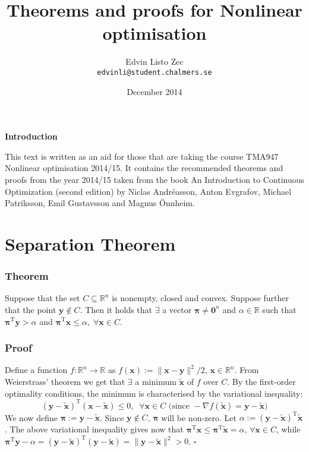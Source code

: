 \documentclass[12pt, a4paper]{article}
\title{Theorems and proofs for Nonlinear optimisation}
\author{Edvin Listo Zec \\ \texttt{edvinli@student.chalmers.se}}
\date{December 2014}
\begin{document}
\maketitle
{}
\thispagestyle{empty}
\centerline{\textbf{Introduction}}
\noindent This text is written as an aid for those that are taking the course TMA947 Nonlinear optimisation 2014/15. It contains the recommended theorems and proofs from the year 2014/15 taken from the book An Introduction to Continuous Optimization (second edition) by Niclas Andréasson, Anton Evgrafov, Michael Patriksson, Emil Gustavsson and Magnus Önnheim.
\newline
 \newline
 
\newpage
\tableofcontents
\thispagestyle{empty}
\newpage
\setcounter{page}{1}


\section{Separation Theorem}
\subsubsection*{Theorem}
Suppose that the set $C\subseteq \mathbb{R}^n$ is nonempty, closed and convex. Suppose further that the point $\bm{y}\not\in C$. Then it holds that $\exists$ a vector $\boldsymbol{\pi} \neq \bm{0}^n$ and $\alpha \in \mathbb{R}$ such that $\boldsymbol{\pi}^\text{T}\bm{y}>\alpha$ and $\boldsymbol{\pi}^\text{T}\bm{x}\leq\alpha,\; \forall \bm{x}\in C$.
\subsubsection*{Proof}
Define a function $f : \mathbb{R}^n \rightarrow \mathbb{R}$ as $f(\bm{x}) := \|\bm{x-y}\|^2/2$, $\bm{x}\in\mathbb{R}^n$. From Weierstrass' theorem we get that $\exists$ a minimum $\bm{\tilde{x}}$ of $f$ over $C$. By the first-order optimality conditions, the minimum is characterised by the variational inequality:
\begin{equation*}
(\bm{y-\tilde{x}})^\text{T}(\bm{x-\tilde{x}})\leq 0,\;\; \forall \bm{x}\in C \text{ (since } -\nabla f(\bm{\tilde{x}})=\bm{y-\tilde{x}})
\end{equation*}
We now define $\boldsymbol{\pi} := \bm{y-\tilde{x}}$. Since $\bm{y}\not\in C$, $\boldsymbol{\pi}$ will be non-zero. Let $\alpha := (\bm{y-\tilde{x}})^\text{T}\bm{\tilde{x}}$. The above variational inequality gives now that $\boldsymbol{\pi}^\text{T}\bm{x} \leq \boldsymbol{\pi}^\text{T}\bm{\tilde{x}} = \alpha$, $\forall \bm{x}\in C$, while $\boldsymbol{\pi}^\text{T}\bm{y}-\alpha = (\bm{y-\tilde{x}})^\text{T}(\bm{y-\tilde{x}}) = \| \bm{y-\tilde{x}}\|^2 > 0$. $\square$
\end{document}
